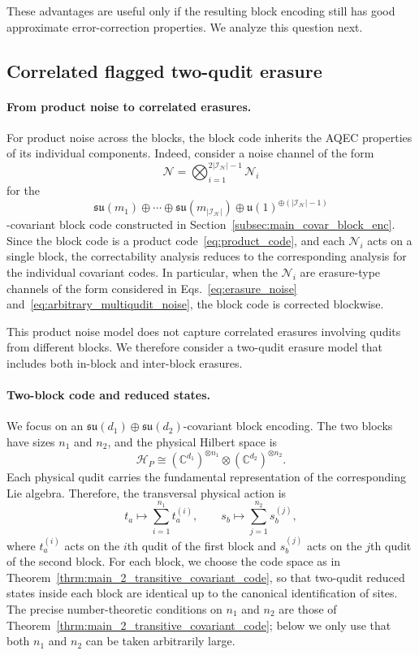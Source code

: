 \documentclass[10pt,twocolumn,superscriptaddress,aps,amsmath,amssymb,citeautoscript,floatfix,prx]{revtex4-2}
\newcounter{alg}
\theoremstyle{plain}
\theoremstyle{plain}
\theoremstyle{plain}
\theoremstyle{plain}
\theoremstyle{plain}
\theoremstyle{plain}
\theoremstyle{plain}
\theoremstyle{definition}
\theoremstyle{plain}
\begin{document}
These advantages are useful only if the resulting block encoding still has good approximate error-correction properties. We analyze this question next.

\subsection{Correlated flagged two-qudit erasure}\label{subsec:main_covar_analog_noise}

\paragraph{From product noise to correlated erasures.}

For product noise across the blocks, the block code inherits the AQEC properties of its individual components. Indeed, consider a noise channel of the form
$$
\mathcal N
=
\bigotimes_{i=1}^{2|\mathcal I_{\mathcal H}|-1}
\mathcal N_i
$$
for the
$$
\mathfrak{su}(m_1)
\oplus
\cdots
\oplus
\mathfrak{su}(m_{|\mathcal I_{\mathcal H}|})
\oplus
\mathfrak{u}(1)^{\oplus(|\mathcal I_{\mathcal H}|-1)}
$$
-covariant block code constructed in Section~\ref{subsec:main_covar_block_enc}. Since the block code is a product code~\eqref{eq:product_code}, 
and each $\mathcal N_i$ acts on a single block, the correctability analysis reduces to the corresponding analysis for the individual covariant codes. 
In particular, when the $\mathcal N_i$ are erasure-type channels of the form considered in Eqs.~\eqref{eq:erasure_noise} and~\eqref{eq:arbitrary_multiqudit_noise}, 
the block code is corrected blockwise.

This product noise model does not capture correlated erasures involving qudits from different blocks. 
We therefore consider a two-qudit erasure model that includes both in-block and inter-block erasures.

\paragraph{Two-block code and reduced states.}

We focus on an
$\mathfrak{su}(d_1)\oplus\mathfrak{su}(d_2)$-covariant block encoding. The two blocks have sizes $n_1$ and $n_2$, and the physical Hilbert space is
$$
\mathcal H_P
\cong
(\mathbb C^{d_1})^{\otimes n_1}
\otimes
(\mathbb C^{d_2})^{\otimes n_2}.
$$
Each physical qudit carries the fundamental representation of the corresponding Lie algebra. Therefore, the transversal physical action is
$$
t_a
\longmapsto
\sum_{i=1}^{n_1} t_a^{(i)},
\qquad
s_b
\longmapsto
\sum_{j=1}^{n_2} s_b^{(j)},
$$
where $t_a^{(i)}$ acts on the $i$th qudit of the first block and $s_b^{(j)}$ acts on the $j$th qudit of the second block. For each block, 
we choose the code space as in Theorem~\ref{thrm:main_2_transitive_covariant_code}, so that two-qudit reduced states inside each block are identical 
up to the canonical identification of sites. The precise number-theoretic conditions on $n_1$ and $n_2$ are those of Theorem~\ref{thrm:main_2_transitive_covariant_code}; 
below we only use that both $n_1$ and $n_2$ can be taken arbitrarily large.
\end{document}
